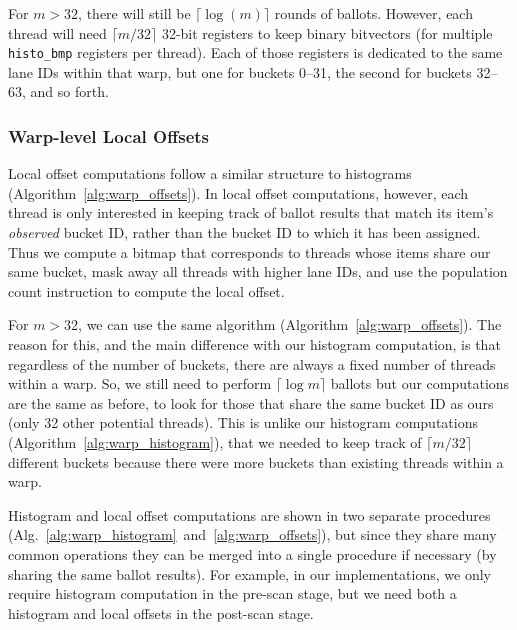 For $m > 32$, there will still be $\lceil \log(m) \rceil$ rounds of ballots. However, each thread will need $\lceil m/32 \rceil$ 32-bit registers to keep binary bitvectors (for multiple \texttt{histo\_bmp} registers per thread). Each of those registers is dedicated to the same lane IDs within that warp, but one for buckets 0--31, the second for buckets 32--63, and so forth.

\subsubsection{Warp-level Local Offsets}\label{subsubsec:warp_offset}
Local offset computations follow a similar structure to histograms (Algorithm~\ref{alg:warp_offsets}). In local offset computations, however, each thread is only interested in keeping track of ballot results that match its item's \emph{observed} bucket ID, rather than the bucket ID to which it has been assigned. Thus we compute a bitmap that corresponds to threads whose items share our same bucket, mask away all threads with higher lane IDs, and use  the population count instruction to compute the local offset.

For $m > 32$, we can use the same algorithm (Algorithm~\ref{alg:warp_offsets}).
The reason for this, and the main difference with our histogram computation, is that regardless of the number of buckets, there are always a fixed number of threads within a warp. 
So, we still need to perform $\lceil \log m\rceil$ ballots but our computations are the same as before, to look for those that share the same bucket ID as ours (only 32 other potential threads). 
This is unlike our histogram computations (Algorithm~\ref{alg:warp_histogram}), that we needed to keep track of $\lceil m/32 \rceil$ different buckets because there were more buckets than existing threads within a warp.

Histogram and local offset computations are shown in two separate procedures (Alg.~\ref{alg:warp_histogram}~and~\ref{alg:warp_offsets}), but since they share many common operations they can be merged into a single procedure if necessary (by sharing the same ballot results). For example, in our implementations, we only require histogram computation in the pre-scan stage, but we need both a histogram and local offsets in the post-scan stage.

